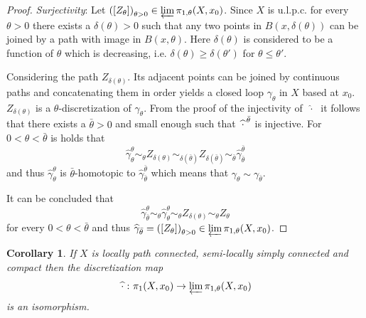 \documentclass[a4paper, 11pt, twoside]{article}
\theoremstyle{break}
\theoremstyle{break}
\newtheorem{col}[thm]{Corollary}
\begin{document}
\begin{proof}
  \textit{Surjectivity}: Let $\left(\left[Z_{\theta}\right]\right)_{\theta > 0} \in \varprojlim \pi_{1,\theta}(X, x_0)$. 
  Since $X$ is u.l.p.c. for every $\theta > 0$ there exists a $\delta(\theta) > 0$ such that any two points in $B(x, \delta(\theta))$ can be joined by a path with image in $B(x, \theta)$.
  Here $\delta(\theta)$ is considered to be a function of $\theta$ which is decreasing, i.e. $\delta(\theta) \geq \delta(\theta')$ for $\theta \leq \theta'$.

  Considering the path $Z_{\delta(\theta)}$. Its adjacent points can be joined by continuous paths and concatenating them in order 
  yields a closed loop $\gamma_{\theta}$ in $X$ based at $x_0$.
  $Z_{\delta(\theta)}$ is a $\theta$-discretization of $\gamma_{\theta}$.
  From the proof of the injectivity of $\; \widehat{\cdot} \;$ it follows that there exists a $\bar{\theta} > 0$ and small enough such that 
  $\: \widehat{\cdot}^{\hspace*{2px}\bar{\theta}}$ is injective. For $0 < \theta < \bar{\theta}$ is holds that
  \begin{equation*}
    \widehat{\gamma}_{\theta}^{\theta} \sim_{\theta} Z_{\delta(\theta)} \sim_{\delta(\bar{\theta})} Z_{\delta(\bar{\theta})} \sim_{\bar{\theta}} \widehat{\gamma}_{\bar{\theta}}^{{\bar{\theta}}}
  \end{equation*}
  and thus $\widehat{\gamma}_{\theta}^{\theta}$ is $\bar{\theta}$-homotopic to $\widehat{\gamma}_{\bar{\theta}}^{{\bar{\theta}}}$ which means that
  $\gamma_{\theta} \sim \gamma_{\bar{\theta}}$.

  It can be concluded that
  \begin{equation*}
    \widehat{\gamma}_{\bar{\theta}}^{\theta} \sim_{\theta} \widehat{\gamma}_{\theta}^{\theta} \sim_{\theta} Z_{\delta(\theta)} \sim_{\theta} Z_{\theta}
  \end{equation*}
  for every $0 < \theta < \bar{\theta}$ and thus $\widehat{\gamma}_{\bar{\theta}} = \left(\left[Z_{\theta}\right]\right)_{\theta > 0} \in \varprojlim \pi_{1,\theta}(X, x_0)$.
\end{proof}

\begin{col}
  If $X$ is locally path connected, semi-locally simply connected and compact then the discretization map 
  \begin{equation*}
     \hspace*{2px}\widehat{\cdot}\hspace*{2px}\colon \pi_1(X, x_0) \to \varprojlim \pi_{1,\theta}(X, x_0)
  \end{equation*}
  is an isomorphism.
\end{col}
\end{document}
